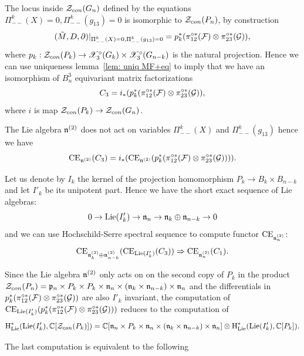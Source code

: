 The locus inside $\mathcal{Z}_{con}(G_n)$ defined by the equations $\Pi_{--}^k(X)=0,\Pi_{--}^k(g_{13})=0$ is isomorphic to $\mathcal{Z}_{con}(P_n)$, by construction
$$(\tilde{M},D,\partial)|_{\Pi_{--}^k(X)=0,\Pi_{--}^k(g_{13})=0}=p_k^*(\pi_{12}^{\circ*}(\mathcal{F})\otimes\pi_{23}^{\circ*}(\mathcal{G})),$$
where $p_k: \mathcal{Z}_{con}(P_k)\to \mathscr{X}^\circ_3(G_k)\times\mathscr{X}^\circ_3(G_{n-k})$ is the natural projection.
Hence we can use uniqueness lemma~\ref{lem: uniq MF+eq} to imply that we have an isomorphism of $B_n^3$ equivariant matrix factorizations
$$ C_3=i_*(p_k^*(\pi_{12}^{\circ*}(\mathcal{F})\otimes\pi_{23}^{\circ*}(\mathcal{G})),$$
where $i$ is map $\mathcal{Z}_{con}(P_k)\to \mathcal{Z}_{con}(G_n)$.

The Lie algebra $\mathfrak{n}^{(2)}$ does not act on variables $\Pi^k_{--}(X)$ and $\Pi_{--}^k(g_{13})$ hence we have
$$ \mathrm{CE}_{\mathfrak{n}^{(2)}}(C_3)=i_*(\mathrm{CE}_{\mathfrak{n}^{(2)}}(p_k^*(\pi_{12}^{\circ*}(\mathcal{F})\otimes \pi_{23}^{\circ*}(\mathcal{G})))).$$

Let us denote by $I_k$ the kernel of the projection homomorphism $P_k\to B_k\times B_{n-k}$ and let $I'_k$ be its unipotent part. Hence we have the short exact sequence of
Lie algebras:
$$0\to \mathrm{Lie}{(I'_k)}\to \mathfrak{n}_n \to \mathfrak{n}_k\oplus \mathfrak{n}_{n-k}\to 0$$
and  we can use Hochschild-Serre spectral sequence to compute functor $\mathrm{CE}_{\mathfrak{n}_n^{(2)}}$:
$$ \mathrm{CE}_{\mathfrak{n}_{k}^{(2)}\oplus \mathfrak{n}_{n-k}^{(2)}}(\mathrm{CE}_{\mathrm{Lie}(I'_{k})}(C_3))\Rightarrow \mathrm{CE}_{\mathfrak{n}_n^{(2)}}(C_1). $$


Since the Lie algebra $\mathfrak{n}^{(2)}$ only acts on on the second copy of $P_k$ in the product
$\mathcal{Z}_{con}(P_n)=\mathfrak{p}_n\times P_k\times P_k\times \mathfrak{n}_n\times (\mathfrak{n}_k\times \mathfrak{n}_{n-k})\times \mathfrak{n}_n$
and the differentials in $p_k^*(\pi_{12}^{\circ*}(\mathcal{F})\otimes \pi_{23}^{\circ*}(\mathcal{G}))$ are also $I'_k$ invariant,
the computation of $\mathrm{CE}_{\mathrm{Lie}(I'_k)}(p_k^*(\pi_{12}^{\circ*}(\mathcal{F})\otimes \pi_{23}^{\circ*}(\mathcal{G})))$ reduces to the computation
of
$$\textup{H}_{\mathrm{Lie}}^*(\mathrm{Lie}(I'_k),\mathbb{C}[\mathcal{Z}_{con}(P_k)])=\mathbb{C}[\mathfrak{n}_n\times P_k\times \mathfrak{n}_n\times (\mathfrak{n}_k\times \mathfrak{n}_{n-k})\times \mathfrak{n}_n]\otimes
\textup{H}_{\mathrm{Lie}}^*(\mathrm{Lie}(I'_k),\mathbb{C}[P_k]).$$

The last computation is equivalent to the following

